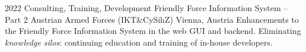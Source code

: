 \cventry
{2022}
{Consulting, Training, Development}
{Friendly Force Information System -- Part 2}
{Austrian Armed Forces (IKT\&CySihZ)}
{Vienna, Austria}
{
  Enhancements to the Friendly Force Information System in the web GUI and backend.
  Eliminating \emph{knowledge silos}: continuing education and training of
  in-house developers.
}
